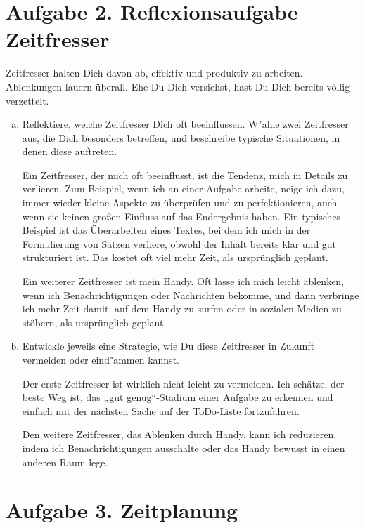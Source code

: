 \documentclass[10pt, oneside]{article}
\begin{document}
\section{Aufgabe 2. Reflexionsaufgabe Zeitfresser}

Zeitfresser halten Dich davon ab, effektiv und produktiv zu arbeiten.
Ablenkungen lauern überall. Ehe Du Dich versiehst, hast Du Dich bereits völlig
verzettelt.
\begin{enumerate}[(a)]
    \item Reflektiere, welche Zeitfresser Dich oft beeinflussen. W"ahle zwei
        Zeitfresser aus, die Dich besonders betreffen, und beschreibe typische
        Situationen, in denen diese auftreten.

        \pagebreak
        Ein Zeitfresser, der mich oft beeinflusst, ist die Tendenz, mich in Details zu
        verlieren. Zum Beispiel, wenn ich an einer Aufgabe arbeite, neige ich dazu,
        immer wieder kleine Aspekte zu überprüfen und zu perfektionieren, auch wenn sie
        keinen großen Einfluss auf das Endergebnis haben. Ein typisches Beispiel ist
        das Überarbeiten eines Textes, bei dem ich mich in der Formulierung von Sätzen
        verliere, obwohl der Inhalt bereits klar und gut strukturiert ist. Das kostet
        oft viel mehr Zeit, als ursprünglich geplant.

        Ein weiterer Zeitfresser ist mein Handy. Oft lasse ich mich leicht
        ablenken, wenn ich Benachrichtigungen oder Nachrichten bekomme, und
        dann verbringe ich mehr Zeit damit, auf dem Handy zu surfen oder in
        sozialen Medien zu stöbern, als ursprünglich geplant.

    \item Entwickle jeweils eine Strategie, wie Du diese Zeitfresser in Zukunft
        vermeiden oder eind"ammen kannst.

        Der erste Zeitfresser ist wirklich nicht leicht zu vermeiden. Ich
        schätze, der beste Weg ist, das „gut genug“-Stadium einer Aufgabe zu
        erkennen und einfach mit der nächsten Sache auf der ToDo-Liste
        fortzufahren.

        Den weitere Zeitfresser, das Ablenken durch Handy, kann ich
        reduzieren, indem ich Benachrichtigungen ausschalte oder das Handy
        bewusst in einen anderen Raum lege.
\end{enumerate}

\section{Aufgabe 3. Zeitplanung}
\end{document}
